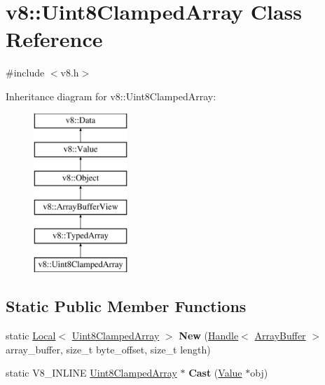 \hypertarget{classv8_1_1_uint8_clamped_array}{}\section{v8\+:\+:Uint8\+Clamped\+Array Class Reference}
\label{classv8_1_1_uint8_clamped_array}


{\ttfamily \#include $<$v8.\+h$>$}

Inheritance diagram for v8\+:\+:Uint8\+Clamped\+Array\+:\begin{figure}[H]
\begin{center}
\leavevmode
\includegraphics[height=6.000000cm]{classv8_1_1_uint8_clamped_array}
\end{center}
\end{figure}
\subsection*{Static Public Member Functions}
\begin{DoxyCompactItemize}
\item 
\hypertarget{classv8_1_1_uint8_clamped_array_ac1979cc1d0591a35e412a0fde9572667}{}static \hyperlink{classv8_1_1_local}{Local}$<$ \hyperlink{classv8_1_1_uint8_clamped_array}{Uint8\+Clamped\+Array} $>$ {\bfseries New} (\hyperlink{classv8_1_1_local}{Handle}$<$ \hyperlink{classv8_1_1_array_buffer}{Array\+Buffer} $>$ array\+\_\+buffer, size\+\_\+t byte\+\_\+offset, size\+\_\+t length)\label{classv8_1_1_uint8_clamped_array_ac1979cc1d0591a35e412a0fde9572667}

\item 
\hypertarget{classv8_1_1_uint8_clamped_array_aa1358e0ac24e305af5c90ba71b73fa7c}{}static V8\+\_\+\+I\+N\+L\+I\+N\+E \hyperlink{classv8_1_1_uint8_clamped_array}{Uint8\+Clamped\+Array} $\ast$ {\bfseries Cast} (\hyperlink{classv8_1_1_value}{Value} $\ast$obj)\label{classv8_1_1_uint8_clamped_array_aa1358e0ac24e305af5c90ba71b73fa7c}

\end{DoxyCompactItemize}
